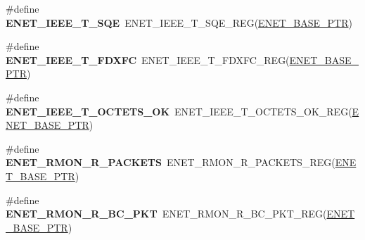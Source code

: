 \begin{DoxyCompactItemize}
\item 
\hypertarget{group___e_n_e_t___register___accessor___macros_ga8129e9ea49a92cf4297418a1be2bcbc0}{}\#define {\bfseries E\+N\+E\+T\+\_\+\+I\+E\+E\+E\+\_\+\+T\+\_\+\+S\+Q\+E}~E\+N\+E\+T\+\_\+\+I\+E\+E\+E\+\_\+\+T\+\_\+\+S\+Q\+E\+\_\+\+R\+E\+G(\hyperlink{group___e_n_e_t___peripheral_gab64a2d991cc2bd76dd55ee25a52dcb5c}{E\+N\+E\+T\+\_\+\+B\+A\+S\+E\+\_\+\+P\+T\+R})\label{group___e_n_e_t___register___accessor___macros_ga8129e9ea49a92cf4297418a1be2bcbc0}

\item 
\hypertarget{group___e_n_e_t___register___accessor___macros_ga3816e7205f62c6b5a14dd88ef4cc0363}{}\#define {\bfseries E\+N\+E\+T\+\_\+\+I\+E\+E\+E\+\_\+\+T\+\_\+\+F\+D\+X\+F\+C}~E\+N\+E\+T\+\_\+\+I\+E\+E\+E\+\_\+\+T\+\_\+\+F\+D\+X\+F\+C\+\_\+\+R\+E\+G(\hyperlink{group___e_n_e_t___peripheral_gab64a2d991cc2bd76dd55ee25a52dcb5c}{E\+N\+E\+T\+\_\+\+B\+A\+S\+E\+\_\+\+P\+T\+R})\label{group___e_n_e_t___register___accessor___macros_ga3816e7205f62c6b5a14dd88ef4cc0363}

\item 
\hypertarget{group___e_n_e_t___register___accessor___macros_ga3cae3e7cfe281844ec9bac51afdba9f0}{}\#define {\bfseries E\+N\+E\+T\+\_\+\+I\+E\+E\+E\+\_\+\+T\+\_\+\+O\+C\+T\+E\+T\+S\+\_\+\+O\+K}~E\+N\+E\+T\+\_\+\+I\+E\+E\+E\+\_\+\+T\+\_\+\+O\+C\+T\+E\+T\+S\+\_\+\+O\+K\+\_\+\+R\+E\+G(\hyperlink{group___e_n_e_t___peripheral_gab64a2d991cc2bd76dd55ee25a52dcb5c}{E\+N\+E\+T\+\_\+\+B\+A\+S\+E\+\_\+\+P\+T\+R})\label{group___e_n_e_t___register___accessor___macros_ga3cae3e7cfe281844ec9bac51afdba9f0}

\item 
\hypertarget{group___e_n_e_t___register___accessor___macros_ga320eaab3591dd85652568ed41eb0e816}{}\#define {\bfseries E\+N\+E\+T\+\_\+\+R\+M\+O\+N\+\_\+\+R\+\_\+\+P\+A\+C\+K\+E\+T\+S}~E\+N\+E\+T\+\_\+\+R\+M\+O\+N\+\_\+\+R\+\_\+\+P\+A\+C\+K\+E\+T\+S\+\_\+\+R\+E\+G(\hyperlink{group___e_n_e_t___peripheral_gab64a2d991cc2bd76dd55ee25a52dcb5c}{E\+N\+E\+T\+\_\+\+B\+A\+S\+E\+\_\+\+P\+T\+R})\label{group___e_n_e_t___register___accessor___macros_ga320eaab3591dd85652568ed41eb0e816}

\item 
\hypertarget{group___e_n_e_t___register___accessor___macros_gaebf9ade1ddf074f64cb7d3880cf48ffe}{}\#define {\bfseries E\+N\+E\+T\+\_\+\+R\+M\+O\+N\+\_\+\+R\+\_\+\+B\+C\+\_\+\+P\+K\+T}~E\+N\+E\+T\+\_\+\+R\+M\+O\+N\+\_\+\+R\+\_\+\+B\+C\+\_\+\+P\+K\+T\+\_\+\+R\+E\+G(\hyperlink{group___e_n_e_t___peripheral_gab64a2d991cc2bd76dd55ee25a52dcb5c}{E\+N\+E\+T\+\_\+\+B\+A\+S\+E\+\_\+\+P\+T\+R})\label{group___e_n_e_t___register___accessor___macros_gaebf9ade1ddf074f64cb7d3880cf48ffe}


\end{DoxyCompactItemize}
